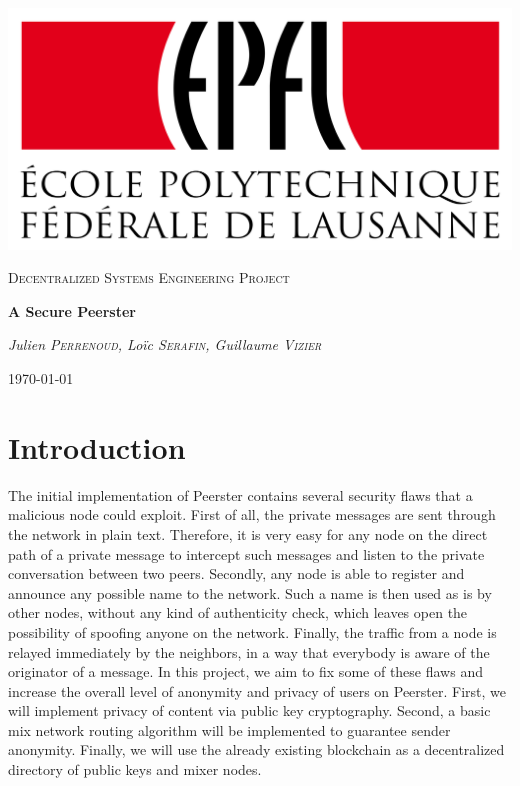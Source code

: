 \documentclass[11pt, a4paper]{article}
\newcommand{\authors}{Julien \textsc{Perrenoud}, Loïc \textsc{Serafin}, Guillaume \textsc{Vizier}}
\renewcommand{\title}{A Secure Peerster}
\begin{document}
\begin{titlepage}
	\centering
	\includegraphics[scale=0.1]{epfl.png} \par
	\vspace{1.5cm}

	{\scshape\Large Decentralized Systems Engineering Project\par}
	\vspace{1.5cm}
	{\huge\bfseries \title \par}
	\vspace{2cm}
	{\Large\itshape \authors \par}
	\vfill
	\vfill

	{\large \today \par}

\end{titlepage}

\tableofcontents

\newpage

\section{Introduction}

    The initial implementation of Peerster contains several security flaws that a malicious node could exploit.
    First of all, the private messages are sent through the network in plain text.
    Therefore, it is very easy for any node on the direct path of a private message to intercept such messages and listen to the private conversation between two peers.
    Secondly, any node is able to register and announce any possible name to the network.
    Such a name is then used as is by other nodes, without any kind of authenticity check, which leaves open the possibility of spoofing anyone on the network.
    Finally, the traffic from a node is relayed immediately by the neighbors, in a way that everybody is aware of the originator of a message.
    In this project, we aim to fix some of these flaws and increase the overall level of anonymity and privacy of users on Peerster.
    First, we will implement privacy of content via public key cryptography.
    Second, a basic mix network routing algorithm will be implemented to guarantee sender anonymity.
    Finally, we will use the already existing blockchain as a decentralized directory of public keys and mixer nodes.
\end{document}
